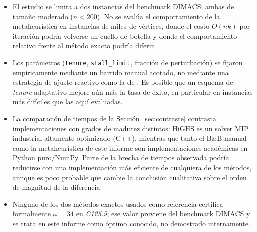 \begin{itemize}
    \item El estudio se limita a dos instancias del benchmark DIMACS; ambas de tamaño moderado ($n<200$). No se evalúa el comportamiento de la metaheurística en instancias de miles de vértices, donde el costo $O(nk)$ por iteración podría volverse un cuello de botella y donde el comportamiento relativo frente al método exacto podría diferir.
    \item Los parámetros (\texttt{tenure}, \texttt{stall\_limit}, fracción de perturbación) se fijaron empíricamente mediante un barrido manual acotado, no mediante una estrategia de ajuste reactivo como la de \textcite{battiti1994reactive}. Es posible que un esquema de \textit{tenure} adaptativo mejore aún más la tasa de éxito, en particular en instancias más difíciles que las aquí evaluadas.
    \item La comparación de tiempos de la Sección~\ref{sec:contraste} contrasta implementaciones con grados de madurez distintos: HiGHS es un solver MIP industrial altamente optimizado (C++), mientras que tanto el B\&B manual como la metaheurística de este informe son implementaciones académicas en Python puro/NumPy. Parte de la brecha de tiempos observada podría reducirse con una implementación más eficiente de cualquiera de los métodos, aunque es poco probable que cambie la conclusión cualitativa sobre el orden de magnitud de la diferencia.
    \item Ninguno de los dos métodos exactos usados como referencia certifica formalmente $\omega=34$ en \textit{C125.9}; ese valor proviene del benchmark DIMACS \parencite{mascia_dimacs} y se trata en este informe como óptimo conocido, no demostrado internamente.
\end{itemize}
